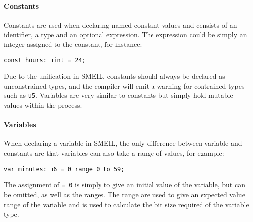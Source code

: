 \paragraph{Constants}
Constants are used when declaring named constant values and consists of an identifier, a type and an optional expression. The expression could be simply an integer assigned to the constant, for instance:
\begin{verbatim}
const hours: uint = 24;
\end{verbatim}
Due to the unification in SMEIL, constants should always be declared as unconstrained types, and the compiler will emit a warning for contrained types such as \texttt{u5}. %
Variables are very similar to constants but simply hold mutable values within the process. %
\paragraph{Variables}
When declaring a variable in SMEIL, the only difference between variable and constants are that variables can also take a range of values, for example:
\begin{verbatim}
var minutes: u6 = 0 range 0 to 59;
\end{verbatim}
The assignment of \texttt{= 0} is simply to give an initial value of the variable, but can be omitted, as well as the ranges. The range are used to give an expected value range of the variable and is used to calculate the bit size required of the variable type.

